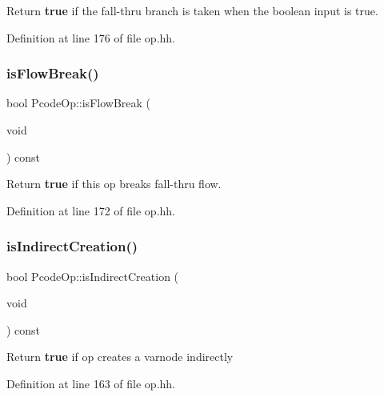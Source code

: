 Return {\bfseries{true}} if the fall-\/thru branch is taken when the boolean input is true. 



Definition at line 176 of file op.\+hh.

\mbox{\label{class_pcode_op_aebefffa77d04696d70f483013faf0333}} 
\subsubsection{\texorpdfstring{isFlowBreak()}{isFlowBreak()}}
{\footnotesize\ttfamily bool Pcode\+Op\+::is\+Flow\+Break (\begin{DoxyParamCaption}\item[{void}]{ }\end{DoxyParamCaption}) const\hspace{0.3cm}{\ttfamily [inline]}}



Return {\bfseries{true}} if this op breaks fall-\/thru flow. 



Definition at line 172 of file op.\+hh.

\mbox{\label{class_pcode_op_afcf832c6a819d1131a4eaaa260a4e55d}} 
\subsubsection{\texorpdfstring{isIndirectCreation()}{isIndirectCreation()}}
{\footnotesize\ttfamily bool Pcode\+Op\+::is\+Indirect\+Creation (\begin{DoxyParamCaption}\item[{void}]{ }\end{DoxyParamCaption}) const\hspace{0.3cm}{\ttfamily [inline]}}

Return {\bfseries{true}} if op creates a varnode indirectly 

Definition at line 163 of file op.\+hh.

\mbox{\label{class_pcode_op_a88294a4264d5f44a011e204fa3f4ae75}} 

